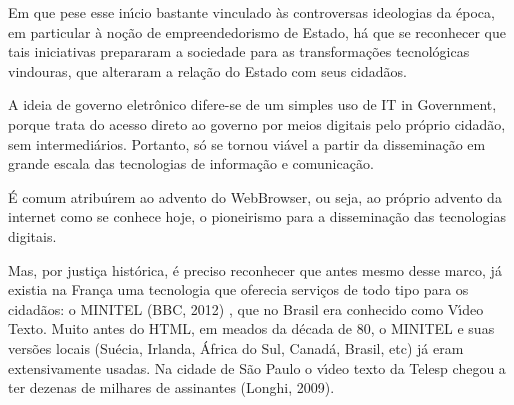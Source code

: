 \documentclass[
12pt,		%
openright,	%
twoside,  %
a4paper,			%
chapter=TITLE,		%
english,			%
french,				%
spanish,			%
brazil				%
]{USPSC-classe/USPSC}
\begin{document}
Em que pese esse in\'{\i}cio bastante vinculado \`as controversas ideologias da \'epoca, em particular \`a no\c{c}\~ao de \textquotedbl empreendedorismo de Estado\textquotedbl , h\'a que se reconhecer que tais iniciativas prepararam a sociedade para as transforma\c{c}\~oes tecnol\'ogicas vindouras, que alteraram a rela\c{c}\~ao do Estado com seus cidad\~aos.










A ideia de governo eletr\^onico difere-se de um simples uso de \textquotedbl IT in Government\textquotedbl , porque trata do acesso direto ao governo por meios digitais pelo pr\'oprio cidad\~ao, sem intermedi\'arios. Portanto, s\'o se tornou vi\'avel a partir da dissemina\c{c}\~ao em grande escala das tecnologias de informa\c{c}\~ao e comunica\c{c}\~ao.










\'E comum atribu\'{\i}rem ao advento do WebBrowser, ou seja, ao pr\'oprio advento da internet como se conhece hoje, o pioneirismo para a dissemina\c{c}\~ao das tecnologias digitais.










Mas, por justi\c{c}a hist\'orica, \'e preciso reconhecer que antes mesmo desse marco, j\'a existia na Fran\c{c}a uma tecnologia que oferecia servi\c{c}os de todo tipo para os cidad\~aos: o MINITEL  (BBC, 2012) , que no Brasil era conhecido como V\'{\i}deo Texto. Muito antes do HTML, em meados da d\'ecada de 80, o MINITEL e suas vers\~oes locais (Su\'ecia, Irlanda, \'Africa do Sul, Canad\'a, Brasil, etc) j\'a eram extensivamente usadas. Na cidade de S\~ao Paulo o v\'{\i}deo texto da Telesp chegou a ter dezenas de milhares de assinantes  (Longhi, 2009).
\end{document}
